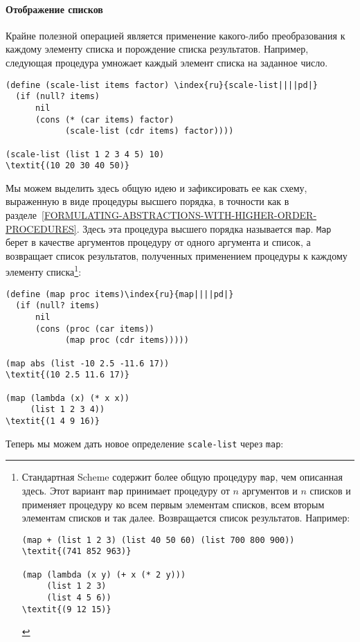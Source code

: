 \paragraph{Отображение списков}


Крайне
полезной операцией является применение какого-либо 
преобразования к каждому элементу списка и порождение списка
результатов.  Например, следующая процедура умножает каждый элемент
списка на заданное число.

\begin{Verbatim}[fontsize=\small]
(define (scale-list items factor) \index{ru}{scale-list||||pd|}
  (if (null? items)
      nil
      (cons (* (car items) factor)
            (scale-list (cdr items) factor))))

(scale-list (list 1 2 3 4 5) 10)
\textit{(10 20 30 40 50)}
\end{Verbatim}

Мы можем выделить здесь общую идею и
зафиксировать ее как схему, выраженную в виде процедуры высшего
порядка, в точности как в разделе~\ref{FORMULATING-ABSTRACTIONS-WITH-HIGHER-ORDER-PROCEDURES}.
Здесь эта процедура высшего порядка называется
{\tt map}. {\tt Map} берет в качестве аргументов
процедуру от одного аргумента и список, а возвращает список результатов,
полученных применением процедуры к каждому элементу списка\footnote{\label{F2.12}
Стандартная Scheme содержит более общую процедуру
{\tt map},
чем описанная здесь.  Этот вариант {\tt map}
принимает процедуру от $n$ аргументов и $n$ списков 
и применяет процедуру ко всем первым элементам списков, всем вторым
элементам списков и так далее.  Возвращается список результатов.
Например:

\begin{Verbatim}
(map + (list 1 2 3) (list 40 50 60) (list 700 800 900))
\textit{(741 852 963)}

(map (lambda (x y) (+ x (* 2 y)))
     (list 1 2 3)
     (list 4 5 6))
\textit{(9 12 15)}
\end{Verbatim}
}:%

\begin{Verbatim}[fontsize=\small]
(define (map proc items)\index{ru}{map||||pd|}
  (if (null? items)
      nil
      (cons (proc (car items))
            (map proc (cdr items)))))

(map abs (list -10 2.5 -11.6 17))
\textit{(10 2.5 11.6 17)}

(map (lambda (x) (* x x))
     (list 1 2 3 4))
\textit{(1 4 9 16)}
\end{Verbatim}
Теперь мы можем дать новое определение {\tt scale-list} через
{\tt map}:

